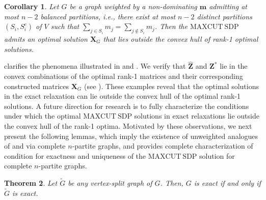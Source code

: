 \documentclass[a4paper,fleqn]{cas-sc}
\newcommand{\X}{\mathbf{X}}
\newcommand{\1}{\mathbf{1}}
\newcommand{\bz}{\mathbf{0}}
\newcommand{\bS}{\mathbf{S}}
\newcommand{\Y}{\mathbf{Y}}
\newcommand{\bu}{\mathbf{u}}
\newcommand{\bZ}{\mathbf{Z}}
\newcommand{\bm}{\mathbf{m}}
\newenvironment{proofsketch}{%
  \par\noindent\textit{Proof sketch.}\ }%
  {\hfill\par}
\newtheorem{theorem}{Theorem}
\newtheorem{corollary}[theorem]{Corollary}
\newcommand{\ignore}[1]{}
\begin{document}
\begin{corollary}\label{convex_hull}
Let $G$ be a graph weighted by a non-dominating $\bm$ admitting at most $n-2$ balanced partitions, i.e., there exist at most \( n-2 \) distinct partitions \( (S_i, S_i^c) \) of \( V \) such that
\( \sum_{j \in S_i} m_j = \sum_{j \notin S_i} m_j \).
Then the $\mathrm{MAXCUT\ SDP}$ admits an optimal solution $\X_G$ that lies outside the convex hull of rank-1 optimal solutions.
\end{corollary}


\ignore{\begin{proofsketch}
For each \(i \in [n]\), construct \(\bu^i\), by setting \(u^i_j = 1\) for \(j \neq i\) and \(u^i_i = -\tfrac{M - m_i}{m_i}\), where \(M = \sum_i m_i\). Observe that each \(\bu^i\) is orthogonal to $\bm$. We show that, there exist \(\{d'_i >0\}, i \in [n]\) such that a weighted sum of the entrywise squares of $\bu^i, i \in [n]$ equals the all-ones vector. Defining \(\X_G = \sum_i d'_i\, \bu^i (\bu^i)^\top\) then yields a feasible point of the $\mathrm{MAXCUT\ SDP}$ whose nullspace is exactly \(\bm\), hence \(\operatorname{rank}(\X_G) = n - 1\). 
The dual variable \(\Y = \tfrac{M}{4}\mathrm{Diag}(\bm)\) produces \(\bS = \tfrac14 \bm \bm^\top\) satisfying complementary slackness since \(\X_G\bm = \bz\).
\end{proofsketch}}

 clarifies the phenomena illustrated in  and . We verify that \(\hat{\bZ}\) and \(\bZ^*\) lie in the convex combinations of the optimal rank-1 matrices and their corresponding constructed matrices \(\X_G\) (see ). These examples reveal that the optimal solutions in the exact relaxation can lie outside the convex hull of the optimal rank-1 solutions. A future direction for research is to fully characterize the conditions under which the optimal $\mathrm{MAXCUT\ SDP}$ solutions in exact relaxations lie outside the convex hull of the rank-1 optima. Motivated by these observations, we next present the following lemmas, which imply the existence of unweighted analogues of  and  via complete \(n\)-partite graphs, and provides complete characterization of condition for exactness and uniqueness of the $\mathrm{MAXCUT\ SDP}$ solution for complete \(n\)-partite graphs.

\begin{theorem}\label{lem6}
Let \( \widetilde{G} \) be any vertex-split graph of \( G \). Then, \( G \) is exact if and only if \( \widetilde{G} \) is exact.
\end{theorem}
\end{document}
